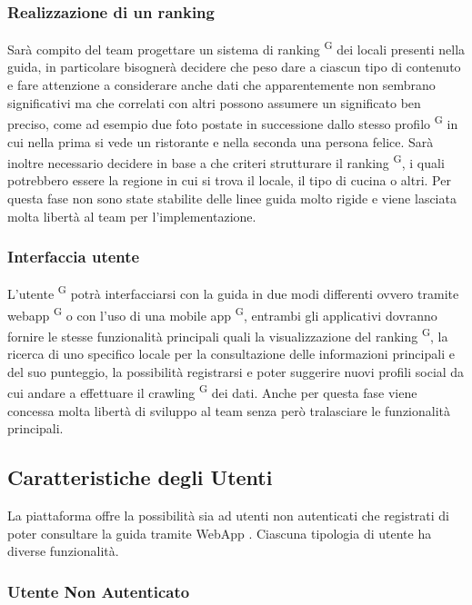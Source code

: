 \subsubsection{Realizzazione di un ranking}
Sarà compito del team progettare un sistema di ranking \textsuperscript{G} dei locali presenti nella guida, in particolare bisognerà decidere che peso dare a ciascun tipo di contenuto e fare attenzione a considerare anche dati che apparentemente non sembrano significativi ma che correlati con altri possono assumere un significato ben preciso, come ad esempio due foto postate in successione dallo stesso profilo \textsuperscript{G} in cui nella prima si vede un ristorante e nella seconda una persona felice. Sarà inoltre necessario decidere in base a che criteri strutturare il ranking \textsuperscript{G}, i quali potrebbero essere la regione in cui si trova il locale, il tipo di cucina o altri. Per questa fase non sono state stabilite delle linee guida molto rigide e viene lasciata molta libertà al team per l’implementazione.

\subsubsection{Interfaccia utente}
L’utente \textsuperscript{G} potrà interfacciarsi con la guida in due modi differenti ovvero tramite webapp \textsuperscript{G} o con l’uso di una mobile app \textsuperscript{G}, entrambi gli applicativi dovranno fornire le stesse funzionalità principali quali la visualizzazione del ranking \textsuperscript{G}, la ricerca di uno specifico locale per la consultazione delle informazioni principali e del suo punteggio, la possibilità registrarsi e poter suggerire nuovi profili social da cui andare a effettuare il crawling \textsuperscript{G} dei dati.
Anche per questa fase viene concessa molta libertà di sviluppo al team senza però tralasciare le funzionalità principali.

\subsection{Caratteristiche degli Utenti}

La piattaforma \glo offre la possibilità sia ad utenti non autenticati che registrati di poter consultare la guida tramite WebApp \glo. Ciascuna tipologia di utente \glo ha diverse funzionalità.

\subsubsection{Utente Non Autenticato}

